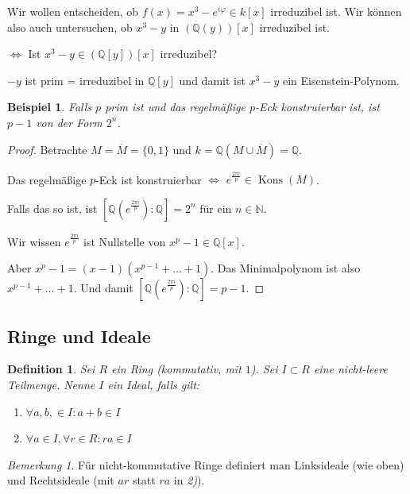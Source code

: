 \documentclass[a4paper,12pt,numbers=noenddot,parskip=full]{scrartcl}
\newcommand{\setN}{\mathbb{N}}
\newcommand{\setQ}{\mathbb{Q}}
\theoremstyle{dotless}
\newtheorem{definition}[theorem]{Definition}
\newtheorem{example}[theorem]{Beispiel}
\theoremstyle{remark}
\newtheorem*{remark}{Bemerkung}
\begin{document}
	Wir wollen entscheiden, ob $f(x) = x^3 - e^{i \varphi} \in k[x]$ irreduzibel ist. Wir können also auch untersuchen, ob $x^3 - y$ in $(\setQ(y))[x]$ irreduzibel ist.
	
	$\Leftrightarrow$ Ist $x^3 - y \in (\setQ[y])[x]$ irreduzibel?
	
	$-y$ ist prim = irreduzibel in $\setQ[y]$ und damit ist $x^3 - y$ ein Eisenstein-Polynom.
	
	\begin{example}
		Falls $p$ prim ist und das regelmäßige $p$-Eck konstruierbar ist, ist $p - 1$ von der Form $2^n$.
	\end{example}

	\begin{proof}
		Betrachte $M = \overline{M} = \{ 0, 1 \}$ und $k = \setQ(M \cup \overline{M}) = \setQ$.
		
		Das regelmäßige $p$-Eck ist konstruierbar $\Leftrightarrow$ $e^{\frac{2 \pi i}{p}} \in \operatorname{Kons}(M)$.
		
		Falls das so ist, ist
		$
			\left[ \setQ(e^{\frac{2 \pi i}{p}}) : \setQ \right] = 2^n
		$
		für ein $n \in \setN$.
		
		Wir wissen $e^{\frac{2 \pi i}{p}}$ ist Nullstelle von $x^p - 1 \in \setQ[x]$.
		
		Aber $x^p - 1 = (x-1)(x^{p-1} + \dots + 1)$. Das Minimalpolynom ist also $x^{p-1} + \dots + 1$. Und damit $\left[ \setQ(e^{\frac{2 \pi i}{p}}) : \setQ \right] = p - 1$.
	\end{proof}

	\subsection{Ringe und Ideale}
	
	\begin{definition}
		Sei $R$ ein Ring (kommutativ, mit $1$). Sei $I \subset R$ eine nicht-leere Teilmenge. Nenne $I$ ein Ideal, falls gilt:
		\begin{enumerate}
			\item $\forall a,b, \in I: a + b \in I$
			\item $\forall a \in I, \forall r \in R: r a \in I$
		\end{enumerate}
	\end{definition}

	\begin{remark}
		Für nicht-kommutative Ringe definiert man Linksideale (wie oben) und Rechtsideale (mit $ar$ statt $ra$ in \textit{2)}).
	\end{remark}
\end{document}
